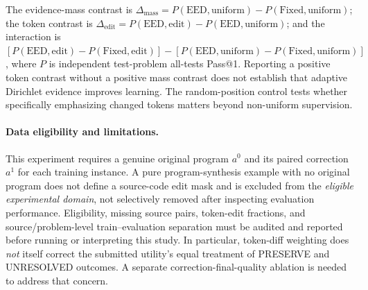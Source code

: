 The evidence-mass contrast is
$\Delta_{\mathrm{mass}}=P(\mathrm{EED,uniform})
-P(\mathrm{Fixed,uniform})$;
the token contrast is
$\Delta_{\mathrm{edit}}=P(\mathrm{EED,edit})
-P(\mathrm{EED,uniform})$;
and the interaction is
$[P(\mathrm{EED,edit})-P(\mathrm{Fixed,edit})]
-[P(\mathrm{EED,uniform})-P(\mathrm{Fixed,uniform})]$,
where $P$ is independent test-problem all-tests Pass@1.
Reporting a positive token contrast without a positive mass
contrast does not establish that adaptive Dirichlet evidence
improves learning. The random-position control tests whether
specifically emphasizing changed tokens matters beyond
non-uniform supervision.

\paragraph{Data eligibility and limitations.}
This experiment requires a genuine original program $a^0$ and its
paired correction $a^1$ for each training instance.
A pure program-synthesis example with no original program does
not define a source-code edit mask and is excluded from the
\emph{eligible experimental domain}, not selectively removed
after inspecting evaluation performance.
Eligibility, missing source pairs, token-edit fractions,
and source/problem-level train--evaluation separation must be
audited and reported before running or interpreting this study.
In particular, token-diff weighting does \emph{not} itself
correct the submitted utility's equal treatment of
PRESERVE and UNRESOLVED outcomes.
A separate correction-final-quality ablation is needed
to address that concern.
